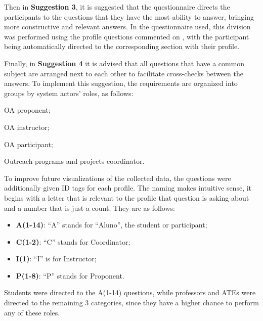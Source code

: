Then in \textbf{Suggestion 3}, it is suggested that the questionnaire directs the participants to the questions that they have the most ability to answer, bringing more constructive and relevant answers.
In the questionnaire used, this division was performed using the profile questions commented on , with the participant being automatically directed to the corresponding section with their profile.


Finally, in \textbf{Suggestion 4} it is advised that all questions that have a common subject are arranged next to each other to facilitate cross-checks between the answers.
To implement this suggestion, the requirements are organized into groups by system actors' roles, as follows:
\begin{inparaenum}[(1)]
  \item \ac{OA} proponent;
  \item \ac{OA} instructor;
  \item \ac{OA} participant;
  \item Outreach programs and projects coordinator.
\end{inparaenum}

To improve future visualizations of the collected data, the questions were additionally given \ac{ID} tags for each profile. The naming makes intuitive sense, it begins with a letter that is relevant to the profile that question is asking about and a number that is just a count. They are as follows:
\begin{itemize}
  \item \textbf{A(1-14)}: ``A'' stands for ``Aluno'', the student or participant;
  \item \textbf{C(1-2)}: ``C'' stands for Coordinator;
  \item \textbf{I(1)}: ``I'' is for Instructor;
  \item \textbf{P(1-8)}: ``P'' stands for Proponent.
\end{itemize}
Students were directed to the A(1-14) questions, while professors and \acp{ATE} were directed to the remaining 3 categories, since they have a higher chance to perform any of these roles.

